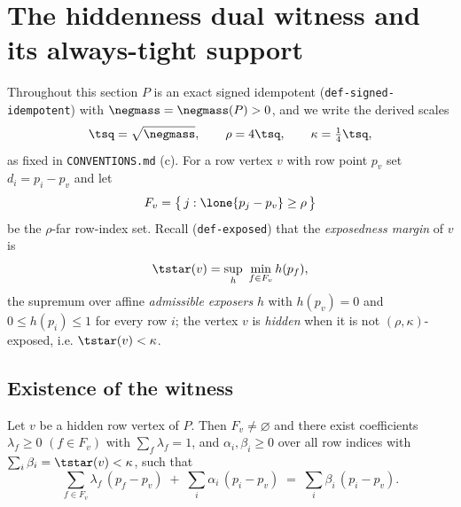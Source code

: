 \section{The hiddenness dual witness and its always-tight support}\label{sec:hiddenness-dual-witness}

Throughout this section $P$ is an exact signed idempotent (\texttt{def-signed-idempotent}) with
$\negmass=\negmass(P)>0$, and we write the derived scales
\[
  \tsq=\sqrt{\negmass},\qquad \rho=4\tsq,\qquad \kappa=\tfrac14\tsq,
\]
as fixed in \texttt{CONVENTIONS.md} (c). For a row vertex $v$ with row point $p_v$ set
$d_i=p_i-p_v$ and let
\[
  F_v=\bigl\{\,j : \lone{p_j-p_v}\ge\rho\,\bigr\}
\]
be the $\rho$-far row-index set. Recall (\texttt{def-exposed}) that the \emph{exposedness margin}
of $v$ is
\begin{equation}\label{eq:hdw-tstar}
  \tstar(v)=\sup_{h}\ \min_{f\in F_v} h(p_f),
\end{equation}
the supremum over affine \emph{admissible exposers} $h$ with $h(p_v)=0$ and $0\le h(p_i)\le1$ for
every row $i$; the vertex $v$ is \emph{hidden} when it is not $(\rho,\kappa)$-exposed, i.e.
$\tstar(v)<\kappa$.

\subsection{Existence of the witness}

\begin{lemma}\label{lem:hiddenness-dual-witness}
Let $v$ be a hidden row vertex of $P$. Then $F_v\neq\varnothing$ and there exist coefficients
$\lambda_f\ge0$ $(f\in F_v)$ with $\sum_{f}\lambda_f=1$, and $\alpha_i,\beta_i\ge0$ over all row
indices with $\sum_i\beta_i=\tstar(v)<\kappa$, such that
\begin{equation}\label{eq:hdw-balance}
  \sum_{f\in F_v}\lambda_f\,(p_f-p_v)\;+\;\sum_i\alpha_i\,(p_i-p_v)
    \;=\;\sum_i\beta_i\,(p_i-p_v).
\end{equation}
\end{lemma}

